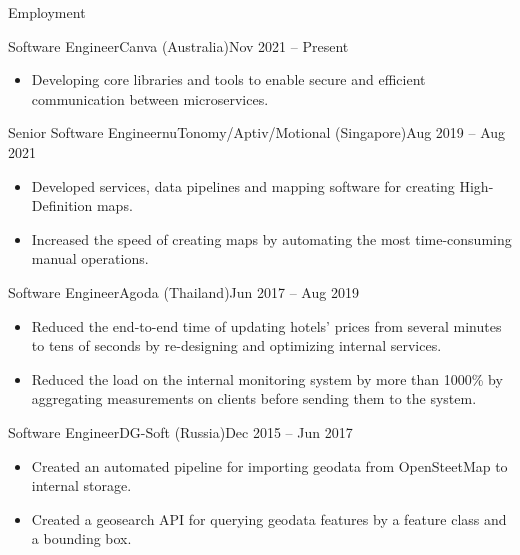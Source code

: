 \documentclass[]{cv}
\begin{document}
	\makeheader

	\begin{cvsection}{Employment}
    \begin{cvsubsection}{Software Engineer}{Canva (Australia)}{Nov 2021 -- Present}
        \begin{itemize}
            \item Developing core libraries and tools to enable secure and efficient communication between microservices.
        \end{itemize}
    \end{cvsubsection}

    \begin{cvsubsection}{Senior Software Engineer}{nuTonomy/Aptiv/Motional (Singapore)}{Aug 2019 -- Aug 2021}
        \begin{itemize}
            \item Developed services, data pipelines and mapping software for creating High-Definition maps.
            \item Increased the speed of creating maps by automating the most time-consuming manual operations.
        \end{itemize}
    \end{cvsubsection}


    \begin{cvsubsection}{Software Engineer}{Agoda (Thailand)}{Jun 2017 -- Aug 2019}
			\begin{itemize}
				\item Reduced the end-to-end time of updating hotels' prices from several minutes to tens of seconds by re-designing and optimizing internal services.
				\item Reduced the load on the internal monitoring system by more than 1000\% by aggregating measurements on clients before sending them to the system.
			\end{itemize}
		\end{cvsubsection}

    \begin{cvsubsection}{Software Engineer}{DG-Soft (Russia)}{Dec 2015 -- Jun 2017}
			\begin{itemize}
				\item Created an automated pipeline for importing geodata from OpenSteetMap to internal storage.
				\item Created a geosearch API for querying geodata features by a feature class and a bounding box.
			\end{itemize}
		\end{cvsubsection}


\end{cvsection}
\end{document}
